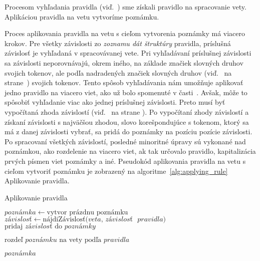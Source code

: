 Procesom vyhľadania pravidla (viď.~) sme získali pravidlo na spracovanie vety. Aplikáciou pravidla na vetu vytvoríme poznámku.

Proces aplikovania pravidla na vetu s cieľom vytvorenia poznámky má viacero krokov. Pre všetky závislosti zo \textit{zoznamu dát štruktúry} pravidla, príslušná závislosť je vyhľadaná v spracovávanej vete. Pri vyhľadávaní príslušnej závislosti sa závislosti neporovnávajú, okrem iného, na základe značiek slovných druhov svojich tokenov, ale podľa nadradených značiek slovných druhov (viď.~ na strane~\pageref{paragraph:superior_pos_tag}) svojich tokenov. Tento spôsob vyhľadávania nám umožňuje aplikovať jedno pravidlo na viacero viet, ako už bolo spomenuté v časti~. Avšak, môže to spôsobiť vyhľadanie viac ako jednej príslušnej závislosti. Preto musí byť vypočítaná zhoda závislostí (viď.~ na strane \pageref{paragraph:dependency_match}). Po vypočítaní zhody závislostí a získaní závislosti s najväčšou zhodou, slovo korešpondujúce s tokenom, ktorý sa má z danej závislosti vybrať, sa pridá do poznámky na pozíciu pozície závislosti. Po spracovaní všetkých závislostí, posledné minoritné úpravy sú vykonané nad poznámkou, ako rozdelenie na viacero viet, ak tak určovalo pravidlo, kapitalizácia prvých písmen viet poznámky a iné. Pseudokód aplikovania pravidla na vetu s cieľom vytvoriť poznámku je zobrazený na algoritme~\ref{alg:applying_rule} Aplikovanie pravidla.

\begin{algorithm}
	\caption[Aplikovanie pravidla]{Aplikovanie pravidla}\label{alg:applying_rule}
	\begin{algorithmic}[1]
		\State $poznámka \gets \text{vytvor prázdnu poznámku}$
		\State $závislosť \gets \text{nájdiZávislosť(} veta \text{, } závislosť\text{ } pravidla \text{)}$
		\State $\text{pridaj } závislosť \text{ do } poznámky$
		\EndIf
		\EndFor
		
		\State $\text{rozdeľ } poznámku \text{ na vety podľa } pravidla$	
		
		\Return $poznámka$
		\EndProcedure
	\end{algorithmic}
\end{algorithm}

